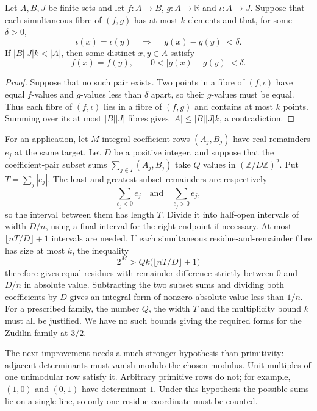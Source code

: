 \documentclass[11pt]{article}
\begin{document}
\begin{theorem}\label{res:boundedfibre}
Let $A,B,J$ be finite sets and let $f:A\to B$, $g:A\to\mathbb R$ and
$\iota:A\to J$.  Suppose that each simultaneous fibre of $(f,g)$ has at
most $k$ elements and that, for some $\delta>0$,
\[
 \iota(x)=\iota(y)\quad\Longrightarrow\quad |g(x)-g(y)|<\delta.
\]
If $|B||J|k<|A|$, then some distinct $x,y\in A$ satisfy
\[
 f(x)=f(y),\qquad 0<|g(x)-g(y)|<\delta.
\]
\end{theorem}
\begin{proof}
Suppose that no such pair exists. Two points in a fibre of
$(f,\iota)$ have equal $f$-values and $g$-values less than $\delta$
apart, so their $g$-values must be equal. Thus each fibre of
$(f,\iota)$ lies in a fibre of $(f,g)$ and contains at most $k$
points. Summing over its at most $|B||J|$ fibres gives
$|A|\le |B||J|k$, a contradiction.
\end{proof}

For an application, let $M$ integral coefficient rows $(A_j,B_j)$ have
real remainders $e_j$ at the same target. Let $D$ be a positive integer,
and suppose that the coefficient-pair subset sums $\sum_{j\in I}(A_j,B_j)$
take $Q$ values in $(\mathbb Z/D\mathbb Z)^2$.
Put $T=\sum_j|e_j|$. The least and greatest
subset remainders are respectively
\[
 \sum_{e_j<0}e_j\quad\text{and}\quad\sum_{e_j>0}e_j,
\]
so the interval between them has length $T$. Divide it into half-open
intervals of width $D/n$, using a final interval for the right
endpoint if necessary. At most $\lfloor nT/D\rfloor+1$ intervals
are needed. If each simultaneous residue-and-remainder fibre has
size at most $k$, the inequality
\[
 2^M>Qk\bigl(\lfloor nT/D\rfloor+1\bigr)
\]
therefore gives equal residues with remainder difference strictly
between $0$ and $D/n$ in absolute value. Subtracting the two subset sums
and dividing both coefficients by $D$ gives an integral form
of nonzero absolute value less than $1/n$. For a prescribed family,
the number $Q$, the width $T$ and the multiplicity bound $k$ must
all be justified. We have no such bounds giving the required forms
for the Zudilin family at $3/2$.


The next improvement needs a much stronger hypothesis than
primitivity: adjacent determinants must vanish modulo the chosen
modulus. Unit multiples of one unimodular row satisfy it. Arbitrary
primitive rows do not; for example, $(1,0)$ and $(0,1)$ have determinant
$1$. Under this hypothesis the possible sums lie on a single line,
so only one residue coordinate must be counted.
\end{document}
